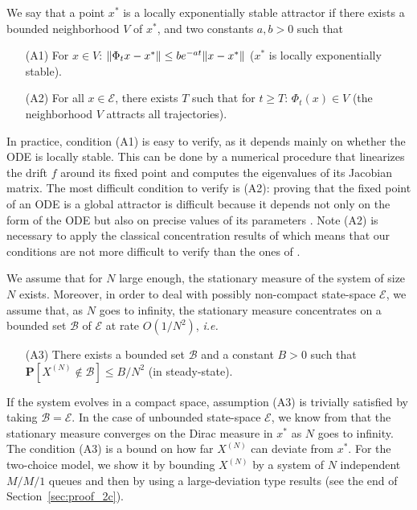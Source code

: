 \documentclass[sigconf]{acmart}
\newcommand\XN{X^{(N)}}
\newcommand\E{\mathcal{E}}
\newcommand\calB{\mathcal{B}}
\newcommand\sProba[1]{\mathbf{P}[#1]}
\newcommand\norm[1]{{\mathchoice{\bnorm{#1}}{\snorm{#1}}{\snorm{#1}}{\snorm{#1}}}}
\newcommand\bnorm[1]{\left\|#1\right\|}
\newcommand\snorm[1]{\|#1\|}
\begin{document}
We say that a point $x^*$ is a locally exponentially stable attractor
if there exists a bounded neighborhood $V$ of $x^*$, and two constants
$a,b>0$ such that
\begin{itemize}
\item[(A1)] For $x\in V$:
  $\norm{\Phi_tx-x^*}\le be^{-at}\norm{x-x^*}$ ($x^*$ is locally
  exponentially stable).
\item[(A2)] For all $x\in\E$, there exists $T$ such that for $t\ge T$:
  $\Phi_{t}(x)\in V$ (the neighborhood $V$ attracts all trajectories).
\end{itemize}
In practice, condition (A1) is easy to verify, as it depends mainly on
whether the ODE is locally stable. This can be done by a numerical
procedure that linearizes the drift $f$ around its fixed point and
computes the eigenvalues of its Jacobian matrix. The most difficult
condition to verify is (A2): proving that the fixed point of an ODE is
a global attractor is difficult because it depends not only on the
form of the ODE but also on precise values of its parameters
\cite{benaim2008class,cho2010validity}.  Note (A2) is necessary to
apply the classical concentration results of \cite{benaim2008class}
which means that our conditions are not more difficult to verify than
the ones of \cite{benaim2008class}.

We assume that for $N$ large enough, the stationary measure of the
system of size $N$ exists. Moreover, in order to deal with possibly
non-compact state-space $\E$, we assume that, as $N$ goes to infinity,
the stationary measure concentrates on a bounded set $\calB$ of $\E$
at rate $O(1/N^2)$, \emph{i.e.}
\begin{itemize}
\item[(A3)] There exists a bounded set $\calB$ and a constant $B>0$
  such that $\sProba{\XN\not\in\calB}\le B/N^2$ (in steady-state). 
\end{itemize}
If the system evolves in a compact space, assumption (A3) is trivially
satisfied by taking $\calB=\E$. In the case of unbounded state-space
$\E$, we know from \cite{benaim2008class} that the stationary measure
converges on the Dirac measure in $x^*$ as $N$ goes to infinity. The
condition (A3) is a bound on how far $\XN$ can deviate from $x^*$.
For the two-choice model, we show it by bounding $\XN$ by a system of
$N$ independent $M/M/1$ queues and then by using a large-deviation
type results (see the end of Section~\ref{sec:proof_2c}).
\end{document}
